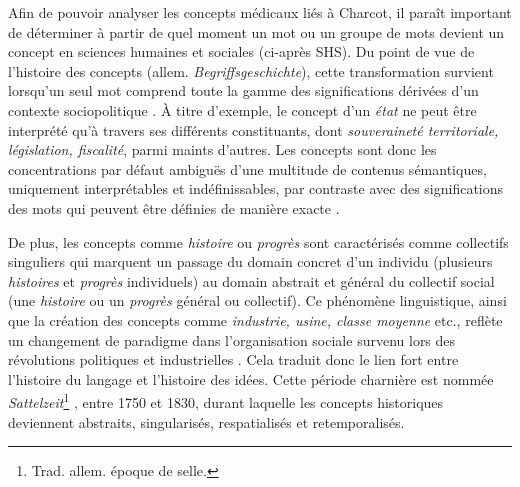 Afin de pouvoir analyser les concepts médicaux liés à Charcot, il paraît important de déterminer à partir de quel moment un mot ou un groupe de mots devient un concept en sciences humaines et sociales (ci-après SHS). Du point de vue de l'histoire des concepts (allem. \textit{Begriffsgeschichte}), cette transformation survient lorsqu'un seul mot comprend toute la gamme des significations dérivées d'un contexte sociopolitique \citep[p. 258]{koselleck2011introduction}. À titre d'exemple, le concept d'un \textit{état} ne peut être interprété qu'à travers ses différents constituants, dont \textit{souveraineté territoriale, législation, fiscalité}, parmi maints d'autres. Les concepts sont donc les concentrations par défaut ambiguës d'une multitude de contenus sémantiques, uniquement interprétables et indéfinissables, par contraste avec des significations des mots qui peuvent être définies de manière exacte \citep[p. 20]{koselleck2011introduction}. 

De plus, les concepts comme \textit{histoire} ou \textit{progrès} sont caractérisés comme \og{}collectifs singuliers\fg{} qui marquent un passage du domain concret d'un individu (plusieurs \textit{histoires} et \textit{progrès} individuels) au domain abstrait et général du collectif social (une \textit{histoire} ou un \textit{progrès} général ou collectif).  Ce phénomène linguistique, ainsi que la création des concepts comme \textit{industrie, usine, classe moyenne} etc., reflète un changement de paradigme dans l'organisation sociale survenu lors des révolutions politiques et industrielles \citep[p. 1]{hobsbawm2010age}. Cela traduit donc le lien fort entre l'histoire du langage et l'histoire des idées. 
Cette période charnière est nommée \textit{Sattelzeit}\footnote{Trad. allem. \og{}époque de selle\fg{}.} \citep[p.~8]{koselleck2011introduction}, entre 1750 et 1830, durant laquelle les concepts historiques deviennent abstraits, singularisés, respatialisés et retemporalisés.
 
